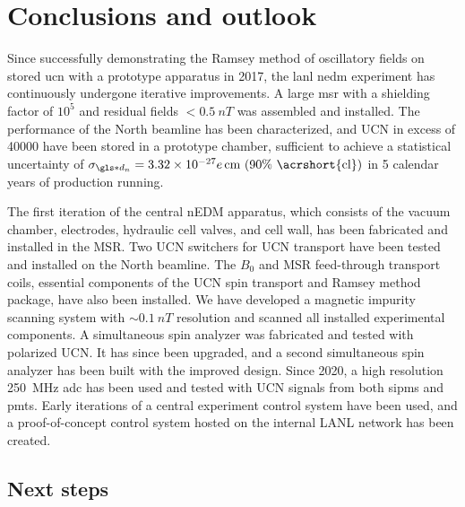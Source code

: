 
\chapter{Conclusions and outlook}\label{chap:conclusion}


Since successfully demonstrating the Ramsey method of oscillatory fields on stored \acrshort{ucn} with a prototype apparatus in 2017, the \acrshort{lanl} \acrshort{nedm} experiment has continuously undergone iterative improvements. A large \acrshort{msr} with a shielding factor of $10^5$ and residual fields $<\qty{0.5}{nT}$ was assembled and installed. The performance of the North beamline has been characterized, and UCN in excess of \num{40000} have been stored in a prototype chamber, sufficient to achieve a statistical uncertainty of $\sigma_{\gls*{d_n}}=\num{3.32e-27}e\,\text{cm (90\% \acrshort{cl})}$ in 5 calendar years of production running.

The first iteration of the central nEDM apparatus, which consists of the vacuum chamber, electrodes, hydraulic cell valves, and cell wall, has been fabricated and installed in the MSR. Two UCN switchers for UCN transport have been tested and installed on the North beamline. The $B_0$ and MSR feed-through transport coils, essential components of the UCN spin transport and Ramsey method package, have also been installed. We have developed a magnetic impurity scanning system with $\sim \qty{0.1}{nT}$ resolution and scanned all installed experimental components. A simultaneous spin analyzer was fabricated and tested with polarized UCN. It has since been upgraded, and a second simultaneous spin analyzer has been built with the improved design. Since 2020, a high resolution \qty{250}{MHz} \acrshort{adc} has been used and tested with UCN signals from both \acrshort{sipm}s and \acrshort{pmt}s. Early iterations of a central experiment control system have been used, and a proof-of-concept control system hosted on the internal LANL network has been created.


\section{Next steps}


